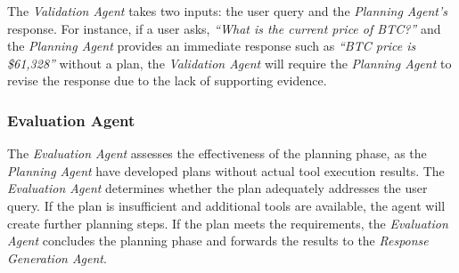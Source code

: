\documentclass[runningheads]{llncs}
\begin{document}
The \textit{Validation Agent} takes two inputs: the user query and the \textit{Planning Agent's} response. For instance, if a user asks, \textit{``What is the current price of BTC?''} and the \textit{Planning Agent} provides an immediate response such as \textit{``BTC price is \$61,328''} without a plan, the \textit{Validation Agent} will require the \textit{Planning Agent} to revise the response due to the lack of supporting evidence.

\subsubsection{Evaluation Agent}
\label{sec:evaluator_agent}
The \textit{Evaluation Agent} assesses the effectiveness of the planning phase, as the \textit{Planning Agent} have developed plans without actual tool execution results. The \textit{Evaluation Agent} determines whether the plan adequately addresses the user query. If the plan is insufficient and additional tools are available, the agent will create further planning steps. If the plan meets the requirements, the \textit{Evaluation Agent} concludes the planning phase and forwards the results to the \textit{Response Generation Agent}.



\end{document}
